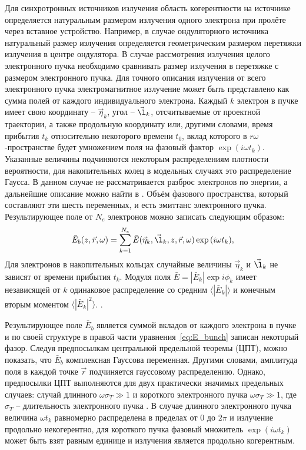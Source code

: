 Для синхротронных источников излучения область когерентности на источнике определяется натуральным размером излучения одного электрона при пролёте через вставное устройство. Например, в случае ондуляторного источника натуральный размер излучения определяется геометрическим размером перетяжки излучения в центре ондулятора. В случае рассмотрения излучения целого электронного пучка необходимо сравнивать размер излучения в перетяжке с размером электронного пучка. Для точного описания излучения от всего электронного пучка электромагнитное излучение может быть представлено как сумма полей от каждого индивидуального электрона. Каждый $k$ электрон в пучке имеет свою координату -- $\vec{\eta}_k$, угол -- $\vec{\l}_k$, отсчитываемые от проектной траектории, а также продольную координату или, другими словами, время прибытия $t_k$ относительно некоторого времени $t_0$, вклад которого в $r\omega$-пространстве будет умножением поля на фазовый фактор $\exp{(i \omega t_k)}$. Указанные величины подчиняются некоторым распределениям плотности вероятности, для накопительных колец в модельных случаях это распределение Гаусса. В данном случае не рассматривается разброс электронов по энергии, а дальнейшие описание можно найти в \cite{geloni_effects_2018}. Объём фазового пространства, который составляют эти шесть переменных, и есть эмиттанс электронного пучка. Результирующее поле от $N_e$ электронов можно записать следующим образом:
\begin{align}
	\bar{E}_{b} (z, \vec{r}, \omega) = \sum\limits_{k=1}^{N_e} \bar{E}(\vec{\eta}_k, \vec{\l}_k, z, \vec{r}, \omega) \exp{(i \omega t_k)},
	\label{eq:E_bunch} 
\end{align}
Для электронов в накопительных кольцах случайные величины $\vec{\eta}_k$ и $\vec{\l}_k$ не зависят от времени прибытия $t_k$. Модуля поля $\bar{E} = |\bar{E}_k|\exp{i\phi_k}$ имеет независящей от $k$ одинаковое распределение со средним $\big \langle|\bar{E}_k|\big \rangle$ и конечным вторым моментом  $\big \langle|\bar{E}_k|^2\big \rangle$. .

Результирующее поле $\bar{E}_{b}$ является суммой вкладов от каждого электрона в пучке и по своей структуре в правой части уравнения~\ref{eq:E_bunch} записан некоторый фазор. Следуя предпосылкам центральной предельной теоремы (ЦПТ), можно показать, что $\bar{E}_{b}$ комплексная Гауссова переменная. Другими словами, амплитуда поля в каждой точке $\vec{r}$ подчиняется гауссовому распределению. Однако, предпосылки ЦПТ выполняются для двух практически значимых предельных случаев: случай длинного $\omega\sigma_T \gg 1$ и короткого электронного пучка $\omega\sigma_T \gg 1$, где $\sigma_T$ -- длительность электронного пучка . В случае длинного электронного пучка величина $\omega t_k$ равномерно распределена в пределах от $0$ до $2\pi$ и излучение продольно некогерентно, для короткого пучка фазовый множитель $\exp{(i \omega t_k)}$ может быть взят равным единице и излучения является продольно когерентным. 

